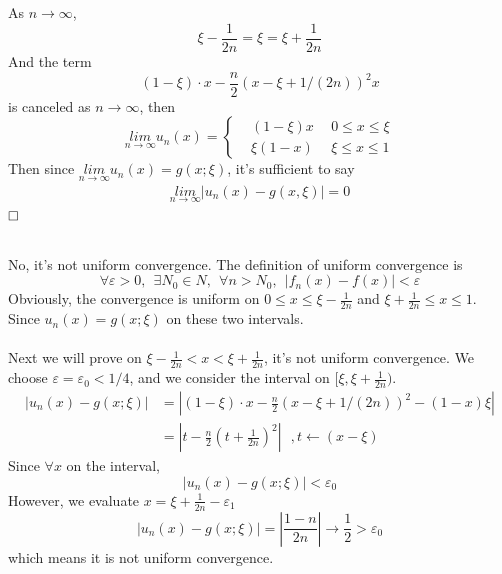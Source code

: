 \documentclass{article}
\newcommand{\qedhere}{$\hfill\ensuremath{\square}$}
\begin{document}
\subsection{}
As $n\rightarrow \infty$, 
\[
	\xi - \frac{1}{2n} = \xi =  \xi + \frac{1}{2n}
\]
And the term $$(1- \xi) \cdot x - \frac{n}{2}(x- \xi+1/(2n))^2  x  $$ is canceled as $n \rightarrow \infty$, then
\[
	\underset{n\rightarrow \infty}{lim} u_n(x) = \left\{\begin{aligned}
	&(1- \xi) x \ \ & 0 \leq x \leq \xi \\
	&\xi (1-x) & \xi \leq x \leq 1
\end{aligned}\right.
\]
Then since $\underset{n\rightarrow \infty}{lim} u_n(x) = g(x; \xi)$, it's sufficient to say
\[
\begin{aligned}
	\underset{n\rightarrow \infty}{lim} |u_n(x) - g(x,\xi)| = 0
\end{aligned}
\]
\qedhere

\subsection{}
No, it's not uniform convergence.
The definition of uniform convergence is 
\[
	\forall \varepsilon>0,\ \ \exists N_0\in N,\ \ \forall n > N_0,\ \  |f_n(x)-f(x)|<\varepsilon 
\]
Obviously, the convergence is uniform on $0 \leq x \leq \xi - \frac{1}{2n}$ and $\xi + \frac{1}{2n} \leq x \leq 1$. Since $u_n(x) = g(x;\xi)$ on these two intervals.\\ \\  
Next we will prove on $\xi - \frac{1}{2n} < x < \xi + \frac{1}{2n}$, it's not uniform convergence. We choose $\varepsilon = \varepsilon_0 < 1/4$, and we consider the interval on $[\xi, \xi + \frac{1}{2n} )$.
\[
	\begin{aligned}
	|u_n(x) - g(x;\xi)| &= |(1- \xi) \cdot x - \frac{n}{2}(x- \xi+1/(2n))^2 - (1-x)\xi | \\
	&= |t - \frac{n}{2}(t+\frac{1}{2n})^2| \ \ \ , t\leftarrow (x - \xi)
	\end{aligned}
\]
Since $\forall x$ on the interval,
\[
	|u_n(x) - g(x;\xi)| < \varepsilon_0
\]
However, we evaluate $x = \xi + \frac{1}{2n} - \varepsilon_1$
\[
	|u_n(x) - g(x;\xi)| = |\frac{1-n}{2n}| \rightarrow \frac{1}{2} > \varepsilon_0
\]
which means it is not uniform convergence.
\end{document}
